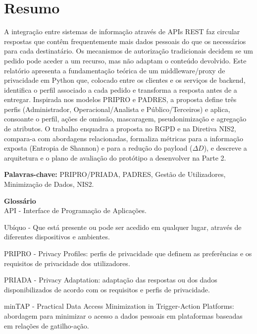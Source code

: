 \documentclass[12pt,reqno, twoside]{amsbook}
\theoremstyle{plain}
\numberwithin{equation}{chapter}
\numberwithin{table}{chapter}
\numberwithin{figure}{chapter}
\numberwithin{section}{chapter}
\begin{document}

\thispagestyle{empty}
\null
\newpage
\setcounter{page}{1}

\frontmatter
{}
\thispagestyle{empty}

\chapter*{Resumo}
\noindent A integração entre sistemas de informação através de APIs REST faz circular respostas que contêm frequentemente mais dados pessoais do que os necessários para cada destinatário. Os mecanismos de autorização tradicionais decidem se um pedido pode aceder a um recurso, mas não adaptam o conteúdo devolvido. Este relatório apresenta a fundamentação teórica de um middleware/proxy de privacidade em Python que, colocado entre os clientes e os serviços de backend, identifica o perfil associado a cada pedido e transforma a resposta antes de a entregar. Inspirada nos modelos PRIPRO e PADRES, a proposta define três perfis (Administrador, Operacional/Analista e Público/Terceiros) e aplica, consoante o perfil, ações de omissão, mascaragem, pseudonimização e agregação de atributos. O trabalho enquadra a proposta no RGPD e na Diretiva NIS2, compara-a com abordagens relacionadas, formaliza métricas para a informação exposta (Entropia de Shannon) e para a redução do payload ($\Delta D$), e descreve a arquitetura e o plano de avaliação do protótipo a desenvolver na Parte 2.

\vspace{0.5cm}
\noindent\textbf{Palavras-chave:} PRIPRO/PRIADA, PADRES, Gestão de Utilizadores, Minimização de Dados, NIS2.

\vspace{0.5cm}
\noindent\textbf{Glossário} \\ API - Interface de Programação de Aplicações.

\noindent Ubíquo - Que está presente ou pode ser acedido em qualquer lugar, através de diferentes dispositivos e ambientes.

\noindent PRIPRO - Privacy Profiles: perfis de privacidade que definem as preferências e os requisitos de privacidade dos utilizadores.

\noindent PRIADA - Privacy Adaptation: adaptação das respostas ou dos dados disponibilizados de acordo com os requisitos e perfis de privacidade.

\noindent minTAP - Practical Data Access Minimization in Trigger-Action Platforms: abordagem para minimizar o acesso a dados pessoais em plataformas baseadas em relações de gatilho-ação.
\end{document}
